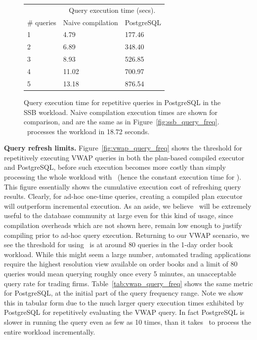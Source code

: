\begin{figure}[htb]
\begin{center}
\begin{tabular}{|l|l|l|}
\hline
& \multicolumn{2}{c|}{Query execution time (secs).} \\
\# queries & Naive compilation & PostgreSQL \\
\hline
1 & 4.79 & 177.46 \\
2 & 6.89 & 348.40 \\
3 & 8.93 & 526.85 \\
4 & 11.02 & 700.97 \\
5 & 13.18 & 876.54 \\
\hline 
\end{tabular}
\end{center}
\vspace{-4mm}
\caption{Query execution time for repetitive queries in PostgreSQL
in the SSB workload. Naive compilation execution times are shown for comparison, and are
the same as in Figure~\ref{fig:ssb_query_freq}. \compiler\ processes the
workload in 18.72 seconds.}
\label{tab:ssb_query_freq}
\end{figure}


\textbf{Query refresh limits.}
Figure~\ref{fig:vwap_query_freq} shows the threshold for repetitively executing
VWAP queries in both the plan-based compiled executor and PostgreSQL, before such
execution becomes more costly than simply processing the whole workload with
\compiler\ (hence the constant execution time for \compiler). This figure
essentially shows the cumulative execution cost of refreshing query results.
Clearly, for ad-hoc one-time queries, creating a compiled plan executor will
outperform incremental execution. As an aside, we believe \compiler\ will be
extremely useful to the database community at large even for this kind of usage,
since compilation overheads which are not shown here, remain low enough to
justify compiling prior to ad-hoc query execution. Returning to our VWAP
scenario, we see the threshold for using \compiler\ is at around 80 queries in
the 1-day order book workload. While this might seem a large number, automated
trading applications require the highest resolution view available on order books
and a limit of 80 queries would mean querying roughly once every 5 minutes, an
unacceptable query rate for trading firms. Table~\ref{tab:vwap_query_freq}
shows the same metric for PostgreSQL, at the initial part of the query
frequency range. Note we show this in tabular form due to the much larger query
execution times exhibited by PostgreSQL for repetitively evaluating the VWAP
query. In fact PostgreSQL is slower in running the query even as few as 10
times, than it takes \compiler\ to process the entire workload incrementally.

